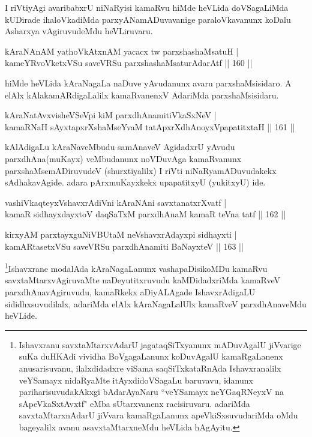 \begin{artha}
I riVtiyAgi avaribabxrU niNaRyisi kamaRvu hiMde heVLida doVSagaLiMda kUDirade 
ihaloVkadiMda parxyANamADuvavanige paraloVkavanunx koDalu Asharxya vAgiruvudeMdu 
heVLiruvaru.
\end{artha}

\begin{shl}
kAraNAnAM yathoVkAtxnAM yacacx tw parxshashaMsatuH |\\
kameYRvoVketxVSu saveVRSu parxshashaMsaturAdarAtf \hfill || 160 ||
\end{shl}

\begin{artha}
hiMde heVLida kAraNagaLa naDuve yAvudanunx avaru parxshaMsisidaro. A elAlx kAlakamARdigaLalilx kamaRvanenxV AdariMda parxshaMsisidaru.
\end{artha}

\begin{shl}
kAraNatAvxvisheVSeV\s pi kiM parxdhAnamitiVkaSxNeV |\\
kamaRNaH sAyxtapxrXshaMseYvaM tatApxrXdhAnoyxVpapatitxtaH \hfill || 161 ||
\end{shl}

\begin{artha}
kAlAdigaLu kAraNaveMbudu samAnaveV AgidadxrU yAvudu parxdhAna(muKayx) veMbudanunx noVDuvAga kamaRvanunx parxshaMsemADiruvudeV (shurxtiyalilx) I riVti niNaRyamADuvudakekx sAdhakavAgide. adara pArxmuKayxkekx upapatitxyU (yukitxyU) ide.
\end{artha}


\begin{shl}
vashiVkaqteyxVshavxrAdiVni kAraNAni savxtanatxrXvatf |\\
kamaR sidhayxdayxtoV daqSaTxM parxdhAnaM kamaR teVna tatf \hfill || 162 ||
\end{shl}

\begin{shl}
kirxyAM parxtayxguNiVBUtaM neVshavxrAdayxpi sidhayxti |\\
kamARtasetxVSu saveVRSu parxdhAnamiti BaNayxteV \hfill || 163 ||
\end{shl}

\begin{artha}
\footnote{Ishavxranu savxtaMtarxvAdarU jagataqSiTxyanunx mADuvAgalU jiVvarige suKa duHKAdi vividha BoVgagaLanunx koDuvAgalU kamaRgaLanenx anusarisuvanu, ilalxdidadxre viSama saqSiTxkataRnAda Ishavxranalilx veYSamayx nidaRyaMte itAyxdidoVSagaLu baruvavu, idanunx pariharisuvudakAkxgi bAdarAyaNaru ``veYSamayx neYGaqRNeyxV na sApeVkaSxtAvxtf" eMba sUtarxvanenx racisiruvaru. adariMda savxtaMtarxnAdarU jiVvara kamaRgaLanunx apeVkiSxsuvudariMda oMdu bageyalilx avanu asavxtaMtarxneMdu heVLida hAgAyitu.}Ishavxrane modalAda kAraNagaLanunx vashapaDisikoMDu kamaRvu savxtaMtarxvAgiruvaMte naDeyutitxruvudu kaMDidadxriMda kamaRveV parxdhAnavAgiruvudu, kamaRkekx aDiyALAgade IshavxrAdigaLU sididhxsuvudilalx, adariMda elAlx kAraNagaLalUlx kamaRveV parxdhAnaveMdu heVLide.
\end{artha}

